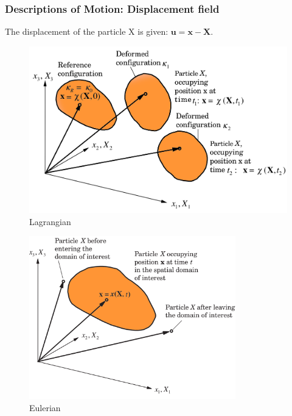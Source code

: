 \documentclass[notes]{beamer}
\begin{document}
\begin{frame}
\frametitle{Descriptions of Motion: Displacement field}
The displacement of the particle X is given: $\mathbf{u = x -X}$.
\noindent
\fboxsep=0pt
\noindent
\begin{minipage}[t]{0.49\linewidth}
	\begin{figure}
		\includegraphics[width=\textwidth]{figs/lagrangian.png}
		\caption*{Lagrangian}
	\end{figure}
\end{minipage}%
\hfill%
\begin{minipage}[t]{0.49\linewidth}
	\begin{figure}
		\includegraphics[width=0.8\textwidth]{figs/eulerian.png}
		\caption*{Eulerian}
	\end{figure}
\end{minipage}	
\end{frame}
\end{document}
